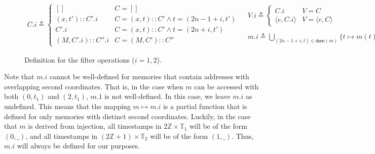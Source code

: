 \documentclass{article}
\theoremstyle{definition}
\newcommand*{\cons}{::}
\newcommand*{\Time}{\mathbb{T}}
\newcommand*{\mem}{m}
\begin{document}
\begin{figure}[h!]
  \[
    \begin{array}{cc}
      C.i\triangleq
      \begin{cases}
        []                  & C=[]                                \\
        (x,t')\cons C'.i    & C=(x,t)\cons C'\wedge t=(2n-1+i,t') \\
        C'.i                & C=(x,t)\cons C'\wedge t=(2n+i,t')   \\
        (M,C'.i)\cons C''.i & C=(M, C')\cons C''
      \end{cases} &
      \begin{array}{l}
        V.i\triangleq
        \begin{cases}
          C.i                  & V=C                  \\
          \langle e,C.i\rangle & V=\langle e,C\rangle
        \end{cases} \\ \\
        \mem.i\triangleq
        \displaystyle\bigcup_{(2n-1+i,t)\in\mathsf{dom}(\mem)}\{t\mapsto \mem(t).i\}
      \end{array}
    \end{array}
  \]
  \caption{Definition for the filter operations ($i=1,2$).}
  \label{fig:concfilter}
\end{figure}

Note that $\mem.i$ cannot be well-defined for memories that contain addresses with overlapping second coordinates.
That is, in the case when $\mem$ can be accessed with both $(0,t_1)$ and $(2,t_1)$, $\mem.1$ is not well-defined.
In this case, we leave $\mem.i$ as undefined.
This means that the mapping $\mem\mapsto\mem.i$ is a partial function that is defined for only memories with distinct second coordinates.
Luckily, in the case that $\mem$ is derived from injection, all timestamps in $2\mathbb{Z}\times\Time_1$ will be of the form $(0,\_)$, and all timestamps in $(2\mathbb{Z}+1)\times\Time_2$ will be of the form $(1,\_)$.
Thus, $\mem.i$ will always be defined for our purposes.
\end{document}
